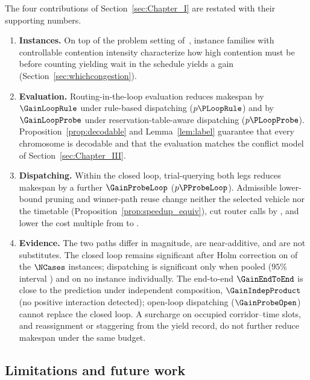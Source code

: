 The four contributions of Section~\ref{sec:Chapter_I} are restated with their supporting numbers.
\begin{enumerate}[leftmargin=*,topsep=2pt,itemsep=2pt]
\item \textbf{Instances.} On top of the problem setting of~\cite{vanos2026exact}, instance families with controllable contention intensity characterize how high contention must be before counting yielding wait in the schedule yields a gain (Section~\ref{sec:whichcongestion}).
\item \textbf{Evaluation.} Routing-in-the-loop evaluation reduces makespan by $\GainLoopRule$ under rule-based dispatching ($p\PLoopRule$) and by $\GainLoopProbe$ under reservation-table-aware dispatching ($p\PLoopProbe$).
Proposition~\ref{prop:decodable} and Lemma~\ref{lem:label} guarantee that every chromosome is decodable and that the evaluation matches the conflict model of Section~\ref{sec:Chapter_III}.
\item \textbf{Dispatching.} Within the closed loop, trial-querying both legs reduces makespan by a further $\GainProbeLoop$ ($p\PProbeLoop$).
Admissible lower-bound pruning and winner-path reuse change neither the selected vehicle nor the timetable (Proposition~\ref{prop:speedup_equiv}), cut router calls by \RouteCallCut{}, and lower the cost multiple from \CostMultBefore{} to \CostMultAfter{}.
\item \textbf{Evidence.} The two paths differ in magnitude, are near-additive, and are not substitutes.
The closed loop remains significant after Holm correction on \CellsSigLoopAdj{} of the $\NCases$ instances; dispatching is significant only when pooled ($95\%$ interval \CIProbeLoop{}) and on no instance individually.
The end-to-end $\GainEndToEnd$ is close to the prediction under independent composition, $\GainIndepProduct$ (no positive interaction detected); open-loop dispatching ($\GainProbeOpen$) cannot replace the closed loop.
A surcharge on occupied corridor--time slots, and reassignment or staggering from the yield record, do not further reduce makespan under the same budget.
\end{enumerate}

\subsection{Limitations and future work}
\label{sec:limitations}
\label{sec:future_work}

